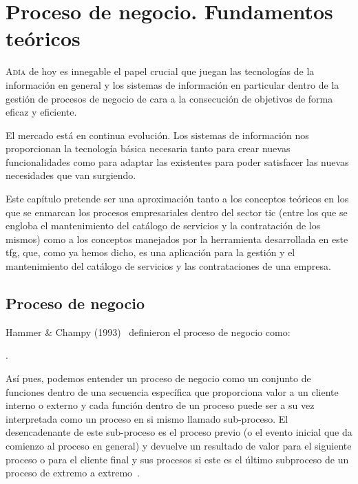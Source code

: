 \chapter{Proceso de negocio. Fundamentos teóricos}
\label{chap:teoria}

\lettrine{A} {día} de hoy es innegable el papel crucial que juegan las tecnologías de la información en general y los sistemas de información en particular dentro de la gestión de procesos de negocio de cara a la consecución de objetivos de forma eficaz y eficiente. 

El mercado está en continua evolución. Los sistemas de información nos proporcionan la tecnología básica necesaria tanto para crear nuevas funcionalidades como para adaptar las existentes para poder satisfacer las nuevas necesidades que van surgiendo. 


Este capítulo pretende ser una aproximación tanto a los conceptos teóricos en los que se enmarcan los procesos empresariales dentro del sector \acrfull{tic} (entre los que se engloba el mantenimiento del catálogo de servicios y la contratación de los mismos) como a los conceptos manejados por la herramienta desarrollada en este \acrshort{tfg}, que, como ya hemos dicho, es una aplicación para la gestión y el mantenimiento del catálogo de servicios y las contrataciones de una empresa.


\section{Proceso de negocio}

Hammer \& Champy (1993)~\cite{Hammer-Champy} definieron el proceso de negocio como:

\begin{displayquote}
. 
\end{displayquote}

Así pues, podemos entender un proceso de negocio como un conjunto de funciones dentro de una secuencia específica que proporciona valor a un cliente interno o externo y cada función dentro de un proceso puede ser a su vez interpretada como un proceso en si mismo llamado sub-proceso. El desencadenante de este sub-proceso es el proceso previo (o el evento inicial que da comienzo al proceso en general) y devuelve un resultado de valor para el siguiente proceso o para el cliente final y sus procesos si este es el último subproceso de un proceso de extremo a extremo~\cite{Kirchmer}. 


